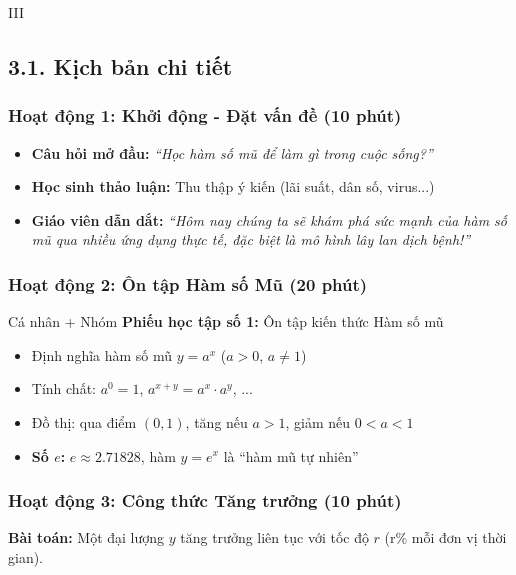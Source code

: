 \documentclass[12pt,a4paper]{article}
\begin{document}
\begin{competitionsection}{III}
\vspace{0.5cm}
\subsection*{3.1. Kịch bản chi tiết}

\subsubsection*{Hoạt động 1: Khởi động - Đặt vấn đề (10 phút)}
\begin{itemize}[leftmargin=*,noitemsep]
\item \textbf{Câu hỏi mở đầu:} \textit{``Học hàm số mũ để làm gì trong cuộc sống?''}
\item \textbf{Học sinh thảo luận:} Thu thập ý kiến (lãi suất, dân số, virus...)
\item \textbf{Giáo viên dẫn dắt:} \textit{``Hôm nay chúng ta sẽ khám phá sức mạnh của hàm số mũ qua nhiều ứng dụng thực tế, đặc biệt là mô hình lây lan dịch bệnh!''}
\end{itemize}

\subsubsection*{Hoạt động 2: Ôn tập Hàm số Mũ (20 phút)}
\begin{task}{Cá nhân + Nhóm}
\textbf{Phiếu học tập số 1:} Ôn tập kiến thức Hàm số mũ
\begin{itemize}[leftmargin=*,noitemsep]
\item Định nghĩa hàm số mũ $y = a^x$ ($a > 0$, $a \neq 1$)
\item Tính chất: $a^0 = 1$, $a^{x+y} = a^x \cdot a^y$, ...
\item Đồ thị: qua điểm $(0, 1)$, tăng nếu $a > 1$, giảm nếu $0 < a < 1$
\item \textbf{Số $e$:} $e \approx 2.71828$, hàm $y = e^x$ là ``hàm mũ tự nhiên''
\end{itemize}
\end{task}

\subsubsection*{Hoạt động 3: Công thức Tăng trưởng (10 phút)}
\begin{mathbox}
\textbf{Bài toán:} Một đại lượng $y$ tăng trưởng liên tục với tốc độ $r$ (r\% mỗi đơn vị thời gian).


\end{mathbox}
\end{competitionsection}
\end{document}
